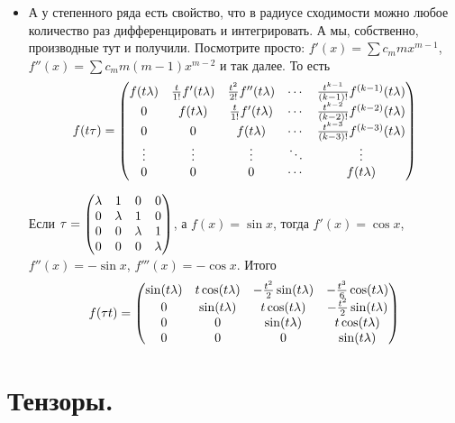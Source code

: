 \documentclass{article}
\begin{document}
    \begin{itemize}
        \item[]\begin{Comment}
            А у степенного ряда есть свойство, что в радиусе сходимости можно любое количество раз дифференцировать и интегрировать. А мы, собственно, производные тут и получили. Посмотрите просто: $f'(x)=\sum\limits c_mmx^{m-1}$, $f''(x)=\sum\limits c_mm(m-1)x^{m-2}$ и так далее. То есть
            $$
            f(t\tau)=\left(\begin{matrix}
                f(t\lambda) & \frac t{1!}f'(t\lambda) & \frac{t^2}{2!}f''(t\lambda) & \cdots & \frac{t^{k-1}}{(k-1)!}f^{(k-1)}(t\lambda)\\
                0 & f(t\lambda) & \frac t{1!}f'(t\lambda) & \cdots & \frac{t^{k-2}}{(k-2)!}f^{(k-2)}(t\lambda)\\
                0 & 0 & f(t\lambda) & \cdots & \frac{t^{k-3}}{(k-3)!}f^{(k-3)}(t\lambda)\\
                \vdots & \vdots & \vdots & \ddots & \vdots\\
                0 & 0 & 0 & \cdots & f(t\lambda)
            \end{matrix}\right)
            $$
        \end{Comment}
        \begin{Example}
            Если $\tau=\left(\begin{matrix}
                \lambda & 1 & 0 & 0\\
                0 & \lambda & 1 & 0\\
                0 & 0 & \lambda & 1\\
                0 & 0 & 0 & \lambda
            \end{matrix}\right)$, а $f(x)=\sin x$, тогда $f'(x)=\cos x$, $f''(x)=-\sin x$, $f'''(x)=-\cos x$. Итого
            $$
            f(\tau t)=\left(\begin{matrix}
                \sin(t\lambda) & t\cos(t\lambda) & -\frac{t^2}2\sin(t\lambda) & -\frac{t^3}6\cos(t\lambda)\\
                0 & \sin(t\lambda) & t\cos(t\lambda) & -\frac{t^2}2\sin(t\lambda)\\
                0 & 0 & \sin(t\lambda) & t\cos(t\lambda)\\
                0 & 0 & 0 & \sin(t\lambda)
            \end{matrix}\right)
            $$
        \end{Example}
    \end{itemize}
    \section{Тензоры.}
\end{document}
